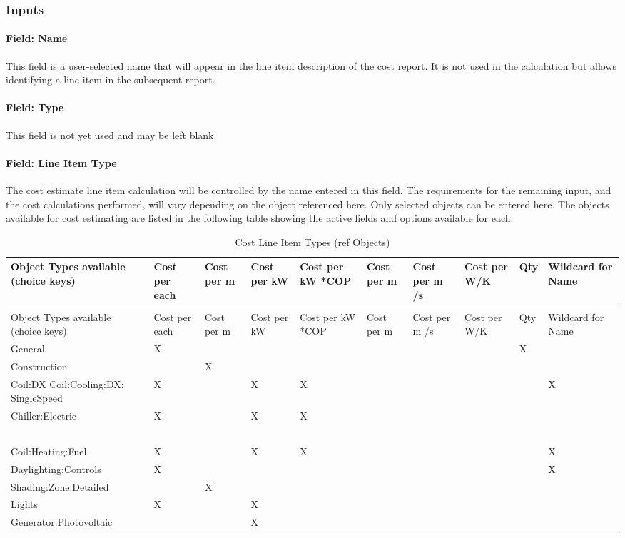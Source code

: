 \subsubsection{Inputs}\label{inputs}

\paragraph{Field: Name}\label{field-name}

This field is a user-selected name that will appear in the line item description of the cost report. It is not used in the calculation but allows identifying a line item in the subsequent report.

\paragraph{Field: Type}\label{field-type}

This field is not yet used and may be left blank.

\paragraph{Field: Line Item Type}\label{field-line-item-type}

The cost estimate line item calculation will be controlled by the name entered in this field. The requirements for the remaining input, and the cost calculations performed, will vary depending on the object referenced here. Only selected objects can be entered here. The objects available for cost estimating are listed in the following table showing the active fields and options available for each.

\begin{longtable}[c]{p{0.6in}p{0.6in}p{0.6in}p{0.6in}p{0.6in}p{0.6in}p{0.6in}p{0.6in}p{0.6in}p{0.6in}}
\caption{Cost Line Item Types (ref Objects) \label{table:cost-line-item-types-ref-objects}} \tabularnewline
\toprule 
Object Types available (choice keys) & Cost per each & Cost per m & Cost per kW & Cost per kW *COP & Cost per m & Cost per m  /s & Cost per W/K & Qty & Wildcard for Name \tabularnewline
\midrule
\endfirsthead

\caption[]{Cost Line Item Types (ref Objects)} \tabularnewline
\toprule 
Object Types available (choice keys) & Cost per each & Cost per m & Cost per kW & Cost per kW *COP & Cost per m & Cost per m  /s & Cost per W/K & Qty & Wildcard for Name \tabularnewline
\midrule
\endhead

General & X & ~ & ~ & ~ & ~ & ~ & ~ & X & ~ \tabularnewline
Construction & ~ & X & ~ & ~ & ~ & ~ & ~ & ~ & ~ \tabularnewline
Coil:DX Coil:Cooling:DX: SingleSpeed & X & ~ & X & X & ~ & ~ & ~ & ~ & X \tabularnewline
Chiller:Electric & X & ~ & X & X & ~ & ~ & ~ & ~ & ~ \tabularnewline
~ & ~ & ~ & ~ & ~ & ~ & ~ & ~ & ~ & ~ \tabularnewline
Coil:Heating:Fuel & X & ~ & X & X & ~ & ~ & ~ & ~ & X \tabularnewline
Daylighting:Controls & X & ~ & ~ & ~ & ~ & ~ & ~ & ~ & X \tabularnewline
Shading:Zone:Detailed & ~ & X & ~ & ~ & ~ & ~ & ~ & ~ & ~ \tabularnewline
Lights & X & ~ & X & ~ & ~ & ~ & ~ & ~ & ~ \tabularnewline
Generator:Photovoltaic & ~ & ~ & X & ~ & ~ & ~ & ~ & ~ & ~ \tabularnewline
\bottomrule
\end{longtable}

